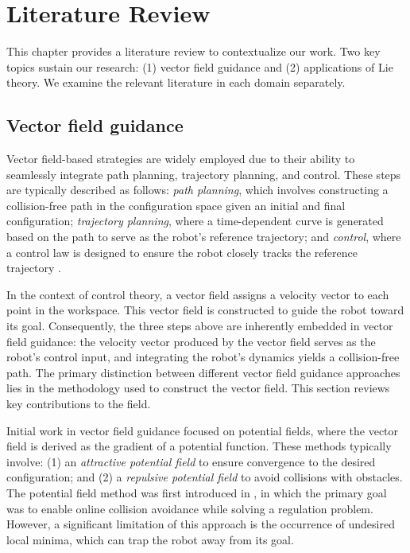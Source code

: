 \chapter{Literature Review} \label{chap:literature-review}
This chapter provides a literature review to contextualize our work. Two key topics sustain our research: (1) vector field guidance and (2) applications of Lie theory. We examine the relevant literature in each domain separately.

\section{Vector field guidance} \label{sec:lit-review-vector-field-guidance}
Vector field-based strategies are widely employed due to their ability to seamlessly integrate path planning, trajectory planning, and control. These steps are typically described as follows: \emph{path planning}, which involves constructing a collision-free path in the configuration space given an initial and final configuration; \emph{trajectory planning}, where a time-dependent curve is generated based on the path to serve as the robot's reference trajectory; and \emph{control}, where a control law is designed to ensure the robot closely tracks the reference trajectory \citep{Rimon1992}.

In the context of control theory, a vector field assigns a velocity vector to each point in the workspace. This vector field is constructed to guide the robot toward its goal. Consequently, the three steps above are inherently embedded in vector field guidance: the velocity vector produced by the vector field serves as the robot's control input, and integrating the robot's dynamics yields a collision-free path. The primary distinction between different vector field guidance approaches lies in the methodology used to construct the vector field. This section reviews key contributions to the field.

Initial work in vector field guidance focused on potential fields, where the vector field is derived as the gradient of a potential function. These methods typically involve: (1) an \emph{attractive potential field} to ensure convergence to the desired configuration; and (2) a \emph{repulsive potential field} to avoid collisions with obstacles. The potential field method was first introduced in \citet{Khatib1985}, in which the primary goal was to enable online collision avoidance while solving a regulation problem. However, a significant limitation of this approach is the occurrence of undesired local minima, which can trap the robot away from its goal.

